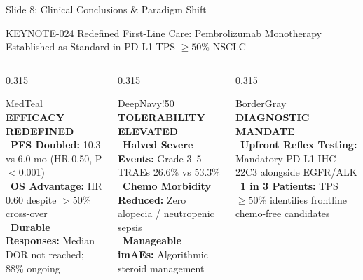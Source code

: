 \documentclass[aspectratio=169,10pt]{beamer}
\begin{document}
\begin{frame}{Slide 8: Clinical Conclusions \& Paradigm Shift}
\begin{actionbanner}
KEYNOTE-024 Redefined First-Line Care: Pembrolizumab Monotherapy Established as Standard in PD-L1 TPS $\ge 50\%$ NSCLC
\end{actionbanner}

\vspace{2pt}

\begin{columns}[T]
  \begin{column}{0.315\textwidth}
    \begin{statcard}{MedTeal}
      \centering
      {\scriptsize\textbf{\color{MedTeal}EFFICACY REDEFINED}}\\[3pt]
      \tiny
      \textbullet\ \textbf{PFS Doubled:} 10.3 vs 6.0 mo (HR 0.50, P$<$0.001)\\[2pt]
      \textbullet\ \textbf{OS Advantage:} HR 0.60 despite $>$50\% cross-over\\[2pt]
      \textbullet\ \textbf{Durable Responses:} Median DOR not reached; 88\% ongoing
    \end{statcard}
  \end{column}

  \begin{column}{0.315\textwidth}
    \begin{statcard}{DeepNavy!50}
      \centering
      {\scriptsize\textbf{\color{DeepNavy}TOLERABILITY ELEVATED}}\\[3pt]
      \tiny
      \textbullet\ \textbf{Halved Severe Events:} Grade 3--5 TRAEs 26.6\% vs 53.3\%\\[2pt]
      \textbullet\ \textbf{Chemo Morbidity Reduced:} Zero alopecia / neutropenic sepsis\\[2pt]
      \textbullet\ \textbf{Manageable imAEs:} Algorithmic steroid management
    \end{statcard}
  \end{column}

  \begin{column}{0.315\textwidth}
    \begin{statcard}{BorderGray}
      \centering
      {\scriptsize\textbf{\color{DeepNavy}DIAGNOSTIC MANDATE}}\\[3pt]
      \tiny
      \textbullet\ \textbf{Upfront Reflex Testing:} Mandatory PD-L1 IHC 22C3 alongside EGFR/ALK\\[2pt]
      \textbullet\ \textbf{1 in 3 Patients:} TPS $\ge 50\%$ identifies frontline chemo-free candidates
    \end{statcard}
  \end{column}
\end{columns}


\end{frame}
\end{document}
